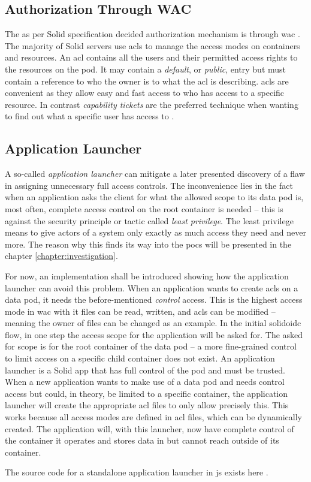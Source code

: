 \subsection{Authorization Through WAC}

The as per Solid specification decided authorization mechanism is through \gls{wac} \cite{wac}. The majority of Solid servers use \glspl{acl} to manage the access modes on containers and resources. An \gls{acl} contains all the users and their permitted access rights to the resources on the pod. It may contain a \textit{default}, or \textit{public}, entry but must contain a reference to who the owner is to what the \gls{acl} is describing. \glspl{acl} are convenient as they allow easy and fast access to who has access to a specific resource. In contrast \textit{capability tickets} are the preferred technique when wanting to find out what a specific user has access to \cite{stallings}.

\subsection{Application Launcher}

A so-called \textit{application launcher} can mitigate a later presented discovery of a flaw in assigning unnecessary full access controls. The inconvenience lies in the fact when an application asks the client for what the allowed scope to its data pod is, most often, complete access control on the root container is needed -- this is against the security principle or tactic called \textit{least privilege}. The least privilege means to give actors of a system only exactly as much access they need and never more. The reason why this finds its way into the \glspl{poc} will be presented in the chapter \ref{chapter:investigation}.

For now, an implementation shall be introduced showing how the application launcher can avoid this problem. When an application wants to create \glspl{acl} on a data pod, it needs the before-mentioned \textit{control} access. This is the highest access mode in \gls{wac} with it files can be read, written, and \glspl{acl} can be modified -- meaning the owner of files can be changed as an example.
In the initial \gls{solidoidc} flow, in one step the access scope for the application will be asked for. The asked for scope is for the root container of the data pod -- a more fine-grained control to limit access on a specific child container does not exist. An application launcher is a Solid app that has full control of the pod and must be trusted. When a new application wants to make use of a data pod and needs control access but could, in theory, be limited to a specific container, the application launcher will create the appropriate \gls{acl} files to only allow precisely this.
This works because all access modes are defined in \gls{acl} files, which can be dynamically created. The application will, with this launcher, now have complete control of the container it operates and stores data in but cannot reach outside of its container.

The source code for a standalone application launcher in \gls{js} exists here \cite{app-launcher}.
